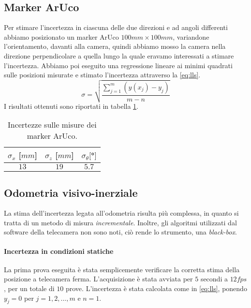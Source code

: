 \documentclass[
	a4paper, %
	10pt, %
]{LTJournalArticle}
\begin{document}
\subsection{Marker ArUco}

Per stimare l'incertezza in ciascuna delle due direzioni e ad angoli differenti abbiamo posizionato un marker ArUco $100mm\times100mm$, variandone l'orientamento, davanti alla camera, quindi abbiamo mosso la camera nella direzione perpendicolare a quella lungo la quale eravamo interessati a stimare l'incertezza. Abbiamo poi eseguito una regressione lineare ai minimi quadrati sulle posizioni misurate e stimato l'incertezza attraverso la \ref{eq:lls}.
\vspace{-4pt}
\begin{equation}
    \sigma = \sqrt{\frac{\sum_{j=1}^{m}(y(x_{j})-y_{j})}{m-n}}
    \label{eq:lls}
\end{equation}
\vspace{-8pt}
I risultati ottenuti sono riportati in tabella \ref{tab:uaruco}.
\begin{table}[h]
    \centering
    \begin{tabular}{|c|c|c|}
    \hline
        $\sigma_x$ [$mm$]& $\sigma_z$ [$mm$]  & $\sigma_{\theta} [$°$]$ \\
        \hline
        $13$& $19$ & $5.7$ \\
    \hline
    \end{tabular}
    \caption{Incertezze sulle misure dei marker ArUco.}
    \label{tab:uaruco}
\end{table}
\vspace{-18pt}
\subsection{Odometria visivo-inerziale}

La stima dell'incertezza legata all'odometria risulta più complessa, in quanto si tratta di un metodo di misura \emph{incrementale}. Inoltre, gli algoritmi utilizzati dal software della telecamera non sono noti, ciò rende lo strumento, una \emph{black-box}.
\vspace{-18pt}
\paragraph{Incertezza in condizioni statiche} La prima prova eseguita è stata semplicemente verificare la corretta stima della posizione a telecamera ferma. L'acquisizione è stata avviata per $5$ secondi a $12 fps$, per un totale di $10$ prove. L'incertezza è stata calcolata come in \ref{eq:lls}, ponendo $y_{j}=0$ per $j=1,2,...,m$ e
$n=1$.
\vspace{-12pt}
\end{document}
